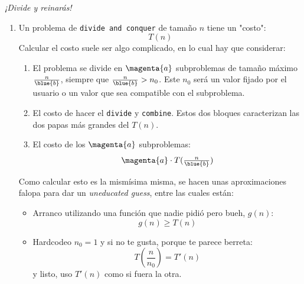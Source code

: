 \textit{¡Divide y reinarás!}
\begin{enumerate}[label=\tiny\purple{\faIcon{snowman}}]
  \item Un problema de \texttt{divide and conquer} de tamaño $n$ tiene un "costo":
        $$
          T(n)
        $$
        Calcular el costo suele ser algo complicado, en lo cual hay que considerar:
        \begin{enumerate}[label=\faIcon{calculator}$_{\arabic*}$]
          \item El problema se divide en $\magenta{a}$ subproblemas de tamaño máximo $\frac{n}{\blue{b}}$,
                siempre que $\frac{n}{\blue{b}} > n_0$.
                Este $n_0$ será un valor fijado por el usuario o un valor que sea compatible con el subproblema.

          \item El costo de hacer el \texttt{divide} y \texttt{combine}. Estos dos bloques caracterizan las dos papas
                más grandes del $T(n)$.

          \item El costo de los $\magenta{a}$ subproblemas:
                $$
                  \textstyle
                  \magenta{a} \cdot T(\frac{n}{\blue{b}})
                $$
        \end{enumerate}

        Como calcular esto es la mismísima \poo misma, se hacen unas aproximaciones
        falopa para dar un \textit{{\tiny un}educated guess}, entre las cuales están:
        \begin{itemize}
          \item Arranco utilizando una función que nadie pidió pero bueh, $g(n)$:
                $$
                  g(n) \geq T(n)
                $$
          \item Hardcodeo $n_0 = 1$ y si no te gusta, porque te parece berreta:
                $$
                  \textstyle
                  T(\frac{n}{n_0}) = T'(n)
                $$
                y listo, uso $T'(n)$ como si fuera la otra.


\end{itemize}
\end{enumerate}
